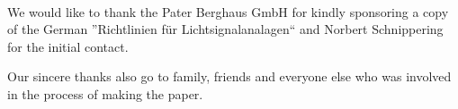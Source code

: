 \vspace{3cm}
\begingroup
{}\\
\endgroup
\vspace{1.5cm}

We would like to thank the Pater Berghaus GmbH for kindly sponsoring a copy of the German ''Richtlinien für Lichtsignalanalagen`` and Norbert Schnippering for the initial contact.

Our sincere thanks also go to family, friends and everyone else who was involved in the process of making the paper.

